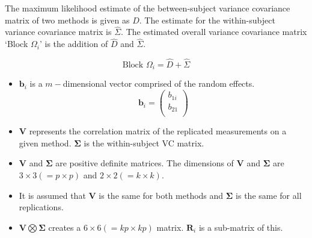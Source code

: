\documentclass[12pt, a4paper]{report}
\theoremstyle{plain}
\theoremstyle{definition}
\theoremstyle{remark}
\begin{document}
The maximum likelihood estimate of the between-subject variance
covariance matrix of two methods is given as $D$. The estimate for
the within-subject variance covariance matrix is $\hat{\Sigma}$.
The estimated overall variance covariance matrix `Block $\Omega_{i}$' is the addition of $\hat{D}$ and $\hat{\Sigma}$.

\begin{equation}
\mbox{Block  }\Omega_{i} = \hat{D} + \hat{\Sigma}
\end{equation}
\begin{itemize}
	
	
	\item $\boldsymbol{b}_{i}$ is a $m-$dimensional vector comprised of
	the random effects.
	\begin{equation}
	\boldsymbol{b}_{i} = \left( \begin{array}{c}
	b_{1i} \\
	b_{21}  \\
	\end{array}\right)
	\end{equation}
	
	\item $\boldsymbol{V}$ represents the correlation matrix of the replicated measurements on a given method.
	$\boldsymbol{\Sigma}$ is the within-subject VC matrix.
	
	\item $\boldsymbol{V}$ and $\boldsymbol{\Sigma}$ are positive
	definite matrices. The dimensions of $\boldsymbol{V}$ and
	$\boldsymbol{\Sigma}$ are $3 \times 3 ( = p \times p )$ and $ 2 \times
	2 (= k \times k)$.
	
	\item It is assumed that $\boldsymbol{V}$ is the same for both methods and $\boldsymbol{\Sigma}$ is
	the same for all replications.
	
	\item $\boldsymbol{V} \bigotimes \boldsymbol{\Sigma}$ creates a $ 6 \times 6 ( = kp \times
	kp)$ matrix.
	$\boldsymbol{R}_{i}$ is a sub-matrix of this.
\end{itemize}
\end{document}
